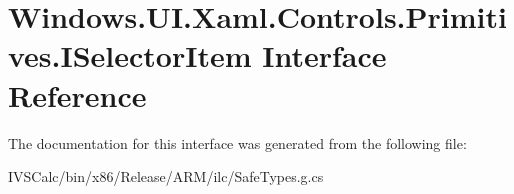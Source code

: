 \hypertarget{interface_windows_1_1_u_i_1_1_xaml_1_1_controls_1_1_primitives_1_1_i_selector_item}{}\section{Windows.\+U\+I.\+Xaml.\+Controls.\+Primitives.\+I\+Selector\+Item Interface Reference}
\label{interface_windows_1_1_u_i_1_1_xaml_1_1_controls_1_1_primitives_1_1_i_selector_item}


The documentation for this interface was generated from the following file\+:\begin{DoxyCompactItemize}
\item 
I\+V\+S\+Calc/bin/x86/\+Release/\+A\+R\+M/ilc/Safe\+Types.\+g.\+cs\end{DoxyCompactItemize}

